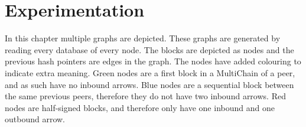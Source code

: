 \chapter{Experimentation}

In this chapter multiple graphs are depicted.
These graphs are generated by reading every database of every node.
The blocks are depicted as nodes and the previous hash pointers are edges in the graph.
The nodes have added colouring to indicate extra meaning.
Green nodes are a first block in a MultiChain of a peer,
and as such have no inbound arrows.
Blue nodes are a sequential block between the same previous peers,
therefore they do not have two inbound arrows.
Red nodes are half-signed blocks,
and therefore only have one inbound and one outbound arrow.






